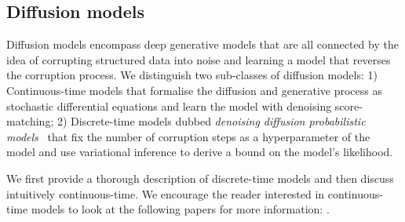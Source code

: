 \subsection{Diffusion models}
Diffusion models encompass deep generative models that are all connected by the idea of corrupting structured data into noise and learning a model that reverses the corruption process. We distinguish two sub-classes of diffusion models: 1) Continuous-time models \citep{song_generative_2019, song2020score} that formalise the diffusion and generative process as stochastic differential equations and learn the model with denoising score-matching; 2) Discrete-time models dubbed \textit{denoising diffusion probabilistic models}~\citep[DDPM][]{sohl-dickstein_deep_2015, ho_denoising_2020} that fix the number of corruption steps as a hyperparameter of the model and use variational inference to derive a bound on the model's likelihood.

We first provide a thorough description of discrete-time models and then discuss intuitively continuous-time. We encourage the reader interested in continuous-time models to look at the following papers for more information: \citep{song_generative_2019, song2020score, song2021maximum, dockhorn2021score}.

